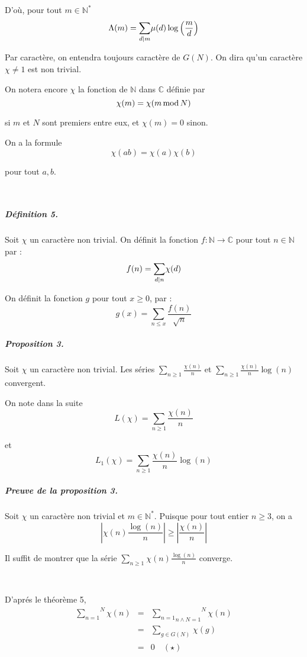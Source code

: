 D'o{\`u}, pour tout $m \in \mathbb{N}^{\ast}$
\[ \Lambda (m) = \underset{d |  m}{\sum} \mu (d) \log \left(
   \frac{m}{d} \right) \]


Par caract{\`e}re, on entendra toujours caract{\`e}re de $G (N)$. On dira
qu'un caract{\`e}re $\chi \neq 1$ est non trivial.

On notera encore $\chi$ la fonction de $\mathbb{N}$ dans $\mathbb{C}$
d{\'e}finie par
\[ \chi (m) = \chi (m \operatorname{mod} N) \]


si $m$ et $N$ sont premiers entre eux, et $\chi (m) = 0$ sinon.

On a la formule
\[ \chi (a b) = \chi (a) \chi (b) \]


pour tout $a, b.$

\

\subparagraph{D{\'e}finition 5.}

Soit $\chi$ un caract{\`e}re non trivial. On d{\'e}finit la fonction $f :
\mathbb{N} \rightarrow \mathbb{C}$ pour tout $n \in \mathbb{N}$ par :
\[ f (n) = \underset{d | n }{\sum} \chi (d) \]


On d{\'e}finit la fonction $g$ pour tout $x \geqslant 0$, par :
\[ g (x) = \underset{n \leqslant x}{\sum} \frac{f (n)}{\sqrt{n}} \]


\subparagraph{Proposition 3.}

Soit $\chi$ un caract{\`e}re non trivial. Les s{\'e}ries $\underset{n
\geqslant 1}{\sum} \frac{\chi (n)}{n}$ et $\underset{n \geqslant 1}{\sum}
\frac{\chi (n)}{n} \log (n)$ convergent.

On note dans la suite
\[ L (\chi) = \underset{n \geqslant 1}{\sum} \frac{\chi (n)}{n} \]


et
\[ L_1 (\chi) = \underset{n \geqslant 1}{\sum} \frac{\chi (n)}{n} \log (n) \]


\subparagraph{Preuve de la proposition 3.}

Soit $\chi$ un caract{\`e}re non trivial et $m \in \mathbb{N}^{\ast}$. Puisque
pour tout entier $n \geqslant 3$, on a
\[ \left| \chi (n) \frac{\log (n)}{n} \right| \geqslant \left| \frac{\chi
   (n)}{n} \right| \]


Il suffit de montrer que la s{\'e}rie $\overset{}{\underset{n \geqslant
1}{\sum}} \chi (n) \frac{\log (n)}{n}$ converge.

\

D'apr{\'e}s le th{\'e}or{\`e}me 5,
\begin{eqnarray*}
  \overset{N}{\underset{n = 1}{\sum}} \chi (n) & = & \overset{N}{\underset{n
  \wedge N = 1}{\underset{n = 1}{\sum}}} \chi (n)\\
  & = & \overset{}{\underset{}{\underset{g \in G (N)}{\sum}}} \chi (g)\\
  & = & 0 \quad (\star)
\end{eqnarray*}


